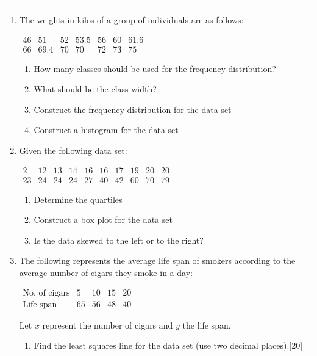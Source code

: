 \documentclass[11pt]{article}
\begin{document}
\Large




\medskip\hrule
\begin{enumerate}

\item The weights in kilos of a group of individuals are as follows:
\begin{center}
$%
\begin{array}{ccccccc}
46 & 51 & 52 & 53.5 & 56 & 60 & 61.6  \\
66 & 69.4 & 70 & 70 & 72 & 73 & 75 %
\end{array}%
$
\end{center}
\begin{enumerate}
    \item How many classes should be used for the frequency distribution?
    \item What should be the class width?
    \item Construct the frequency distribution for the data set
    \item Construct a histogram for the data set
\end{enumerate}






\item Given the following data set:
 \begin{center}
$%
\begin{array}{cccccccccc}
2 & 12 & 13 & 14 & 16 & 16 & 17 & 19 & 20 & 20  \\
23 & 24 & 24 & 24 & 27 & 40 & 42 & 60 & 70 & 79 %
\end{array}%
$
\end{center}

\begin{enumerate}
    \item Determine the quartiles
    \item Construct a box plot for the data set
    \item Is the data skewed to the left or to the right?
\end{enumerate}

\item The following represents the average life span of  smokers according to the average number of cigars they smoke in a day:
\begin{center}
$%
\begin{array}{ccccc}
\text{No. of cigars} & 5 & 10 & 15 & 20
\\
\text{Life span} & 65 & 56 & 48 & 40 %
\end{array}%
$
\end{center}
Let $x$ represent the number of cigars and $y$ the life span.
\begin{enumerate}
\item Find the least squares line for the data set (use two decimal places).\hfill[20]


\end{enumerate}
\end{enumerate}
\end{document}
